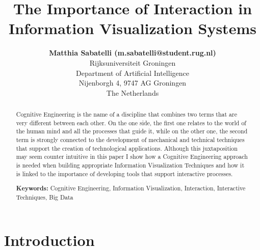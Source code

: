 \documentclass[10p,letterpaper]{article}
\title{The Importance of Interaction in Information Visualization Systems}
\author{{\large \bf Matthia Sabatelli (m.sabatelli@student.rug.nl)} \\
  Rijksuniversiteit Groningen\\Department of Artificial Intelligence\\ Nijenborgh 4,
  9747 AG Groningen\\ The Netherlands}
\begin{document}
\maketitle


\begin{abstract}

Cognitive Engineering is the name of a discipline that combines two terms that are very different between each other. On the one side, the first one relates to the world of the human mind and all the processes that guide it, while on the other one, the second term is strongly connected to the development of mechanical and technical techniques that support the creation of technological applications. Although this juxtaposition may seem counter intuitive in this paper I show how a Cognitive Engineering approach is needed when building appropriate Information Visualization Techniques and how it is linked to the importance of developing tools that support interactive processes.       

\textbf{Keywords:} 
Cognitive Engineering, Information Visualization, Interaction, Interactive Techniques, Big Data
\end{abstract}


\section{Introduction}
\end{document}
